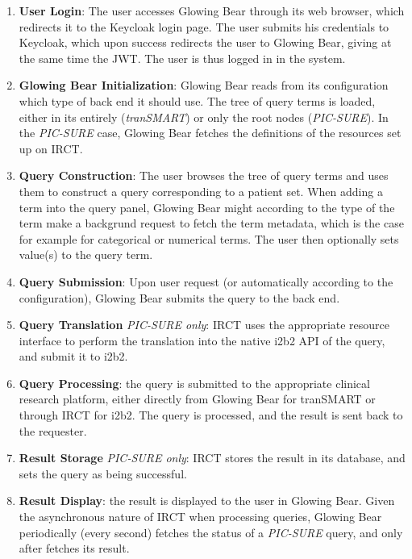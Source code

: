 \begin{enumerate}
\item \textbf{User Login}:
The user accesses Glowing Bear through its web browser, which redirects it to the Keycloak login page.
The user submits his credentials to Keycloak, which upon success redirects the user to Glowing Bear, giving at the same time the JWT.
The user is thus logged in in the system.

\item \textbf{Glowing Bear Initialization}:
Glowing Bear reads from its configuration which type of back end it should use.
The tree of query terms is loaded, either in its entirely (\textit{tranSMART}) or only the root nodes (\textit{PIC-SURE}).
In the \textit{PIC-SURE} case, Glowing Bear fetches the definitions of the resources set up on IRCT.

\item \textbf{Query Construction}:
The user browses the tree of query terms and uses them to construct a query corresponding to a patient set.
When adding a term into the query panel, Glowing Bear might according to the type of the term make a backgrund request to fetch the term metadata, which is the case for example for categorical or numerical terms.
The user then optionally sets value(s) to the query term.

\item \textbf{Query Submission}:
Upon user request (or automatically according to the configuration), Glowing Bear submits the query to the back end.

\item \textbf{Query Translation} \textit{PIC-SURE only}: IRCT uses the appropriate resource interface to perform the translation into the native i2b2 API of the query, and submit it to i2b2.

\item \textbf{Query Processing}: the query is submitted to the appropriate clinical research platform, either directly from Glowing Bear for tranSMART or through IRCT for i2b2.
The query is processed, and the result is sent back to the requester.

\item \textbf{Result Storage} \textit{PIC-SURE only}: IRCT stores the result in its database, and sets the query as being successful.

\item \textbf{Result Display}: the result is displayed to the user in Glowing Bear.
Given the asynchronous nature of IRCT when processing queries, Glowing Bear periodically (every second) fetches the status of a \textit{PIC-SURE} query, and only after fetches its result.

\end{enumerate}


